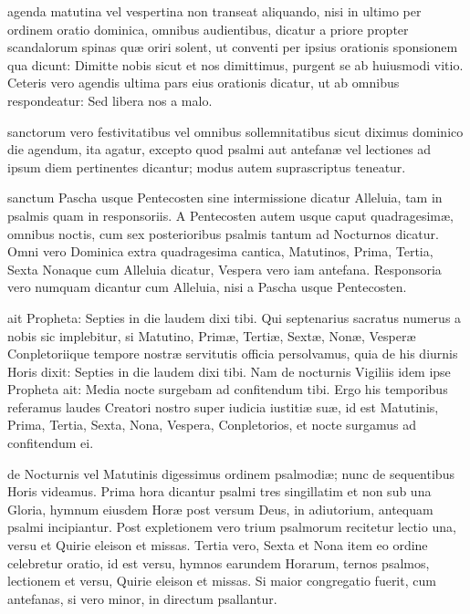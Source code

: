 \documentclass[fontsize=9pt,paper=A6,twoside,BCOR=1mm,DIV=22,headinclude]{scrarticle}
\begin{document}
\begin{multicols}{2}
{
 agenda matutina vel vespertina non transeat aliquando, nisi in ultimo per ordinem oratio dominica, omnibus audientibus, dicatur a priore propter scandalorum spinas quæ oriri solent, ut conventi per ipsius orationis sponsionem qua dicunt: Dimitte nobis sicut et nos dimittimus, purgent se ab huiusmodi vitio. Ceteris vero agendis ultima pars eius orationis dicatur, ut ab omnibus respondeatur: Sed libera nos a malo. 

}

{
 sanctorum vero festivitatibus vel omnibus sollemnitatibus sicut diximus dominico die agendum, ita agatur, excepto quod psalmi aut antefanæ vel lectiones ad ipsum diem pertinentes dicantur; modus autem suprascriptus teneatur. 

}

{
 sanctum Pascha usque Pentecosten sine intermissione dicatur Alleluia, tam in psalmis quam in responsoriis. A Pentecosten autem usque caput quadragesimæ, omnibus noctis, cum sex posterioribus psalmis tantum ad Nocturnos dicatur. Omni vero Dominica extra quadragesima cantica, Matutinos, Prima, Tertia, Sexta Nonaque cum Alleluia dicatur, Vespera vero iam antefana. Responsoria vero numquam dicantur cum Alleluia, nisi a Pascha usque Pentecosten. 

}

{
 ait Propheta: Septies in die laudem dixi tibi. Qui septenarius sacratus numerus a nobis sic implebitur, si Matutino, Primæ, Tertiæ, Sextæ, Nonæ, Vesperæ Conpletoriique tempore nostræ servitutis officia persolvamus, quia de his diurnis Horis dixit: Septies in die laudem dixi tibi. Nam de nocturnis Vigiliis idem ipse Propheta ait: Media nocte surgebam ad confitendum tibi. Ergo his temporibus referamus laudes Creatori nostro super iudicia iustitiæ suæ, id est Matutinis, Prima, Tertia, Sexta, Nona, Vespera, Conpletorios, et nocte surgamus ad confitendum ei. 

}

{
 de Nocturnis vel Matutinis digessimus ordinem psalmodiæ; nunc de sequentibus Horis videamus. Prima hora dicantur psalmi tres singillatim et non sub una Gloria, hymnum eiusdem Horæ post versum Deus, in adiutorium, antequam psalmi incipiantur. Post expletionem vero trium psalmorum recitetur lectio una, versu et Quirie eleison et missas. Tertia vero, Sexta et Nona item eo ordine celebretur oratio, id est versu, hymnos earundem Horarum, ternos psalmos, lectionem et versu, Quirie eleison et missas. Si maior congregatio fuerit, cum antefanas, si vero minor, in directum psallantur.

}
\end{multicols}
\end{document}
